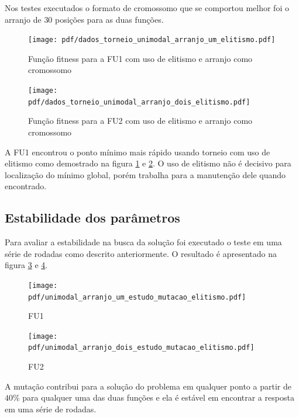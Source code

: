 \documentclass[conference]{IEEEtran}
\begin{document}
Nos testes executados o formato de cromossomo que se comportou melhor foi o arranjo de $30$ posições para as duas funções.

\begin{figure}[th]
        \centering
        \texttt{[image: pdf/dados\_torneio\_unimodal\_arranjo\_um\_elitismo.pdf]}
        \caption{Função fitness para a FU1 com uso de elitismo e arranjo como cromossomo}
        \label{fig:unimodal_um:fitness}
\end{figure}

\begin{figure}[th]
        \centering
        \texttt{[image: pdf/dados\_torneio\_unimodal\_arranjo\_dois\_elitismo.pdf]}
        \caption{Função fitness para a FU2 com uso de elitismo e arranjo como cromossomo}
        \label{fig:unimodal_dois:fitness}
\end{figure}

A FU1 encontrou o ponto mínimo mais rápido usando torneio com uso de elitismo como demostrado na figura \ref{fig:unimodal_um:fitness} e \ref{fig:unimodal_dois:fitness}. O uso de elitismo não é decisivo para localização do mínimo global, porém trabalha para a manutenção dele quando encontrado.

\subsection{Estabilidade dos parâmetros}


Para avaliar a estabilidade na busca da solução foi executado o teste em uma série de rodadas como descrito anteriormente. O resultado é apresentado na figura \ref{fig:unimodal_um:estabilidade} e \ref{fig:unimodal_dois:estabilidade}.


\begin{figure}[th]
        \centering
        \texttt{[image: pdf/unimodal\_arranjo\_um\_estudo\_mutacao\_elitismo.pdf]}
        \caption{FU1}
        \label{fig:unimodal_um:estabilidade}
\end{figure}

\begin{figure}[th]
        \centering
        \texttt{[image: pdf/unimodal\_arranjo\_dois\_estudo\_mutacao\_elitismo.pdf]}
        \caption{FU2}
        \label{fig:unimodal_dois:estabilidade}
\end{figure}

A mutação contribui para a solução do problema em qualquer ponto a partir de $40\%$ para qualquer uma das duas funções e ela é estável em encontrar a resposta em uma série de rodadas.
\end{document}
